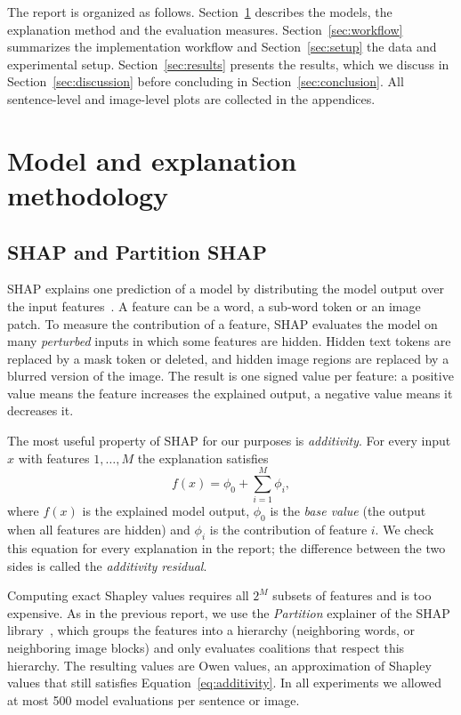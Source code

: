 \documentclass[11pt,a4paper]{article}
\begin{document}
The report is organized as follows. Section~\ref{sec:method} describes the models, the
explanation method and the evaluation measures. Section~\ref{sec:workflow} summarizes the
implementation workflow and Section~\ref{sec:setup} the data and experimental setup.
Section~\ref{sec:results} presents the results, which we discuss in
Section~\ref{sec:discussion} before concluding in Section~\ref{sec:conclusion}. All
sentence-level and image-level plots are collected in the appendices.

\section{Model and explanation methodology}\label{sec:method}

\subsection{SHAP and Partition SHAP}

SHAP explains one prediction of a model by distributing the model output over the input
features~\cite{lundberg2017}. A feature can be a word, a sub-word token or an image patch.
To measure the contribution of a feature, SHAP evaluates the model on many
\emph{perturbed} inputs in which some features are hidden. Hidden text tokens are replaced
by a mask token or deleted, and hidden image regions are replaced by a blurred version of
the image. The result is one signed value per feature: a positive value means the
feature increases the explained output, a negative value means it decreases it.

The most useful property of SHAP for our purposes is \emph{additivity}. For every input
$x$ with features $1,\dots,M$ the explanation satisfies
\begin{equation}
  f(x) = \phi_0 + \sum_{i=1}^{M} \phi_i ,
  \label{eq:additivity}
\end{equation}
where $f(x)$ is the explained model output, $\phi_0$ is the \emph{base value} (the output
when all features are hidden) and $\phi_i$ is the contribution of feature $i$. We check
this equation for every explanation in the report; the difference between the two sides
is called the \emph{additivity residual}.

Computing exact Shapley values requires all $2^M$ subsets of features and is too expensive.
As in the previous report, we use the \emph{Partition} explainer of the SHAP
library~\cite{shapdocs}, which groups the features into a hierarchy (neighboring words, or
neighboring image blocks) and only evaluates coalitions that respect this hierarchy. The
resulting values are Owen values, an approximation of Shapley values that still satisfies
Equation~\eqref{eq:additivity}. In all experiments we allowed at most 500 model evaluations
per sentence or image.
\end{document}
